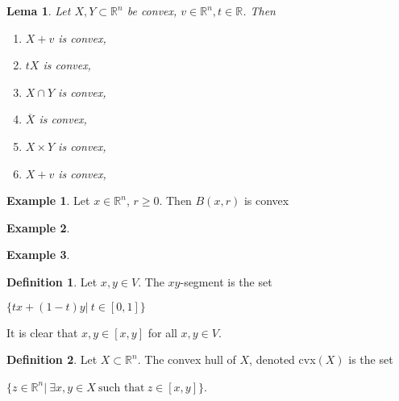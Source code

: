 \documentclass[]{article}
\newtheorem{lemma}{Lema}[section]
\theoremstyle{definition}
\newtheorem{definition}{Definition}[section]
\theoremstyle{definition}
\newtheorem{exmp}{Example}[section]
\newcommand{\bb}{\mathbb}
\begin{document}
		\begin{lemma}
			Let $X, Y \subset \bb{R}^n$ be convex, $v \in \bb{R}^n, t \in \bb{R}$. Then
			
			\begin{enumerate}
				\item $X + v$ is convex,
				
				\item $tX$ is convex,

				\item $X \cap Y$ is convex,

				\item $\overline{X}$ is convex,

				\item $X \times Y$ is convex,

				\item $X + v$ is convex,

			\end{enumerate} 
		\end{lemma}
		
		
		
		\begin{exmp}
			Let $x \in \bb{R}^n$, $r \geq 0$. Then $B(x,r)$ is convex			
		\end{exmp}
	
	
		\begin{exmp}
				
		\end{exmp}

		\begin{exmp}
	
		\end{exmp}

		\begin{definition}
			Let $x, y \in V$. The $xy$-segment is the set 
			
			\begin{center}
				$\{ tx + (1-t)y| \ t \in [0, 1] \}$
			\end{center}
		\end{definition}

		It is clear that $x, y \in [x, y]$ for all $x, y \in V$.


		\begin{definition}
			Let $X \subset \bb{R}^n$. The convex hull of $X$, denoted cvx$(X)$ is the set 
			
			\begin{center}
				$\{ z \in \bb{R}^n| \ \exists x, y \in X \ \text{such that}\  z \in [x, y] \}$.
			\end{center}
		\end{definition}
\end{document}
